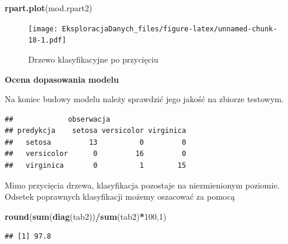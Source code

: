 \documentclass[]{book}
\newenvironment{Shaded}{\begin{snugshade}}{\end{snugshade}}
\newcommand{\DataTypeTok}[1]{\textcolor[rgb]{0.13,0.29,0.53}{#1}}
\newcommand{\DecValTok}[1]{\textcolor[rgb]{0.00,0.00,0.81}{#1}}
\newcommand{\KeywordTok}[1]{\textcolor[rgb]{0.13,0.29,0.53}{\textbf{#1}}}
\newcommand{\NormalTok}[1]{#1}
\newcommand{\OperatorTok}[1]{\textcolor[rgb]{0.81,0.36,0.00}{\textbf{#1}}}
\newcommand{\StringTok}[1]{\textcolor[rgb]{0.31,0.60,0.02}{#1}}
\theoremstyle{plain}
\theoremstyle{definition}
\theoremstyle{definition}
\theoremstyle{definition}
\theoremstyle{definition}
\theoremstyle{remark}
\begin{document}
\begin{Shaded}
\begin{Highlighting}[]
\KeywordTok{rpart.plot}\NormalTok{(mod.rpart2)}
\end{Highlighting}
\end{Shaded}

\begin{figure}
\centering
\texttt{[image: EksploracjaDanych\_files/figure-latex/unnamed-chunk-18-1.pdf]}
\caption{\label{fig:unnamed-chunk-18}Drzewo klasyfikacyjne po przycięciu}
\end{figure}

\textbf{Ocena dopasowania modelu}

Na koniec budowy modelu należy sprawdzić jego jakość na zbiorze testowym.

\begin{Shaded}
\end{Shaded}

\begin{verbatim}
##             obserwacja
## predykcja    setosa versicolor virginica
##   setosa         13          0         0
##   versicolor      0         16         0
##   virginica       0          1        15
\end{verbatim}

Mimo przycięcia drzewa, klasyfikacja pozostaje na niezmienionym poziomie. Odsetek poprawnych klasyfikacji możemy oszacować za pomocą

\begin{Shaded}
\begin{Highlighting}[]
\KeywordTok{round}\NormalTok{(}\KeywordTok{sum}\NormalTok{(}\KeywordTok{diag}\NormalTok{(tab2))}\OperatorTok{/}\KeywordTok{sum}\NormalTok{(tab2)}\OperatorTok{*}\DecValTok{100}\NormalTok{,}\DecValTok{1}\NormalTok{)}
\end{Highlighting}
\end{Shaded}

\begin{verbatim}
## [1] 97.8
\end{verbatim}
\end{document}
